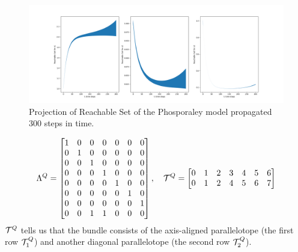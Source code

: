 \begin{example}
\begin{figure}[t!]
  \hspace*{-2.4cm}
  \includegraphics[width=\reachplotwidth\textwidth]{figures/PhosporlayProjOn X_1, X_2, X_3.png}
  \caption{Projection of Reachable Set of the Phosporaley model propagated 300 steps in time.}
  \label{fig:kaa_phos}
\end{figure}

\begin{equation}
  \Lambda^Q = \begin{bmatrix}
            1 & 0 & 0 & 0 & 0 & 0 & 0 \\
            0 & 1 & 0 & 0 & 0 & 0 & 0 \\
            0 & 0 & 1 & 0 & 0 & 0 & 0 \\
            0 & 0 & 0 & 1 & 0 & 0 & 0 \\
            0 & 0 & 0 & 0 & 1 & 0 & 0 \\
            0 & 0 & 0 & 0 & 0 & 1 & 0 \\
            0 & 0 & 0 & 0 & 0 & 0 & 1 \\
            0 & 0 & 1 & 1 & 0 & 0 & 0 \\
            \end{bmatrix}, \quad
  \mathcal{T}^Q = \begin{bmatrix}
        0 & 1 & 2 & 3 & 4 & 5 & 6 \\
        0 & 1 & 2 & 4 & 5 & 6 & 7
        \end{bmatrix}
\end{equation}
$\mathcal{T}^Q$ tells us that the bundle consists of the axis-aligned parallelotope (the first row $\mathcal{T}^Q_1$) and another diagonal parallelotope (the second row $\mathcal{T}^Q_2$).
\end{example}
